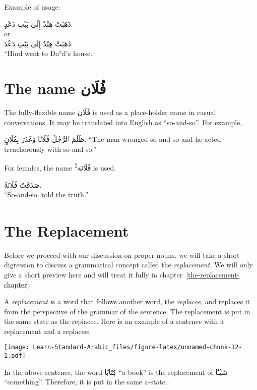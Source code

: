 \documentclass[
  10pt,
]{book}
\begin{document}
Example of usage:

\foreignlanguage{arabic}{ذَهَبَتْ هِنْدٌ إِلَىٰ بَيْتِ دَعْدٍ.}\\
or\\
\foreignlanguage{arabic}{ذَهَبَتْ هِنْدُ إِلَىٰ بَيْتِ دَعْدَ.}\\
``Hind went to Daʿd's house.

\section{\texorpdfstring{The name \foreignlanguage{arabic}{فُلَان}}{The name فُلَان}}\label{the-name-ux641ux644ux627ux646}

The fully-flexible name \foreignlanguage{arabic}{فُلَان} is used as a place-holder name in casual conversations. It may be translated into English as \enquote{so-and-so}. For example,

\foreignlanguage{arabic}{ظَلَمَ ٱلرَّجُلُ فُلَانًا وَغَدَرَ بِفُلَانٍ.}
\enquote{The man wronged so-and-so and he acted treacherously with so-and-so.}

For females, the name \foreignlanguage{arabic}{فُلَانَة\textsuperscript{2}} is used.

\foreignlanguage{arabic}{صَدَقَتْ فُلَانَةُ.}\\
\enquote{So-and-so\textsubscript{f} told the truth.}

\section{The Replacement}\label{the-replacement}

Before we proceed with our discussion on proper nouns, we will take a short digression to discuss a grammatical concept called the \emph{replacement}. We will only give a short preview here and will treat it fully in chapter~\ref{the-replacement-chapter}.

A \emph{replacement} is a word that follows another word, the \emph{replacee}, and replaces it from the perspective of the grammar of the sentence. The replacement is put in the same state as the replacee.
Here is an example of a sentence with a replacement and a replacee:

\texttt{[image: Learn-Standard-Arabic\_files/figure-latex/unnamed-chunk-12-1.pdf]}

In the above sentence, the word \foreignlanguage{arabic}{کِتَابًا} \enquote{a book} is the replacement of
\foreignlanguage{arabic}{شَيْـًٔا} \enquote{something}. Therefore, it is put in the same a-state.
\end{document}
